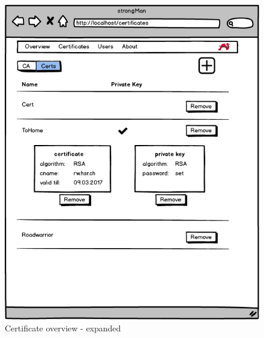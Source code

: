 \begin{figure}[H]
	\centering
	\includegraphics[width=400pt]{images/mockups/cert_overview_expanded2.png}
	\caption{Certificate overview - expanded}
\end{figure}

